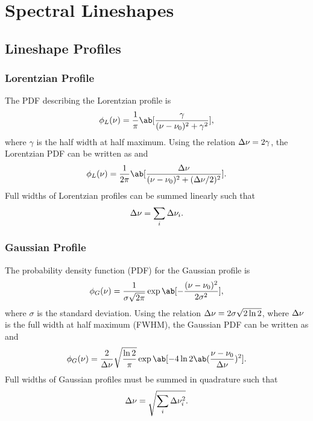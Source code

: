 \chapter{Spectral Lineshapes}

\section{Lineshape Profiles}

\subsection{Lorentzian Profile}

The PDF describing the Lorentzian profile is
\begin{equation*}
    \phi_L(\nu) = \frac{1}{\pi}\ab[\frac{\gamma}{(\nu - \nu_0)^2 + \gamma^2}],
\end{equation*}
where $\gamma$ is the half width at half maximum.
Using the relation $\adif{\nu} = 2\gamma$, the Lorentzian PDF can be written as \cite[52]{foxStudentsGuideAtomic2018} and \cite[133]{hansonSpectroscopyOpticalDiagnostics2016}
\begin{equation*}
    \phi_L(\nu) = \frac{1}{2\pi}\ab[\frac{\adif{\nu}}{(\nu - \nu_0)^2 + (\adif{\nu}/2)^2}].
\end{equation*}
Full widths of Lorentzian profiles can be summed linearly such that \cite[361]{josyulaHypersonicNonequilibriumFlows2015}
\begin{equation*}
    \adif{\nu} = \sum_i \adif{\nu}_i.
\end{equation*}

\subsection{Gaussian Profile}

The probability density function (PDF) for the Gaussian profile is
\begin{equation*}
    \phi_G(\nu) = \frac{1}{\sigma\sqrt{2\pi}}\exp\ab[-\frac{(\nu - \nu_0)^2}{2\sigma^2}],
\end{equation*}
where $\sigma$ is the standard deviation.
Using the relation $\adif{\nu} = 2\sigma\sqrt{2\ln{2}}$, where $\adif{\nu}$ is the full width at half maximum (FWHM), the Gaussian PDF can be written as \cite[55]{foxStudentsGuideAtomic2018} and \cite[138]{hansonSpectroscopyOpticalDiagnostics2016}
\begin{equation*}
    \phi_G(\nu) = \frac{2}{\adif{\nu}}\sqrt{\frac{\ln{2}}{\pi}}\exp\ab[-4\ln{2}\ab(\frac{\nu - \nu_0}{\adif{\nu}})^2].
\end{equation*}
Full widths of Gaussian profiles must be summed in quadrature such that \cite[361]{josyulaHypersonicNonequilibriumFlows2015}
\begin{equation*}
    \adif{\nu} = \sqrt{\sum_i \adif{\nu}_i^2}.
\end{equation*}

